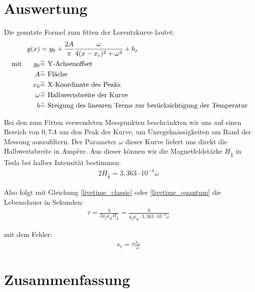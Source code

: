 \documentclass[12pt]{article}
\begin{document}
\section{Auswertung}
Die genutzte Formel zum fitten der Lorentzkurve lautet:
\begin{align}
 y(x) &= y_0+\frac{2A}{\pi}\frac{\omega}{4(x-x_c)^2+\omega^2}+b_x \\
\notag \textnormal{ mit }~~~~ y_0 &\widehat{=} \textnormal{ Y-Achsenoffset } \\
\notag A &\widehat{=} \textnormal{ Fläche } \\
\notag x_0 &\widehat{=} \textnormal{ X-Koordinate des Peaks } \\
\notag \omega &\widehat{=} \textnormal{ Halbwertsbreite der Kurve } \\
\notag b &\widehat{=} \textnormal{ Steigung des linearen Terms zur berücksichtigung der Temperatur}
\end{align}

Bei den zum Fitten verwendeten Messpunkten beschränkten wir uns auf einen Bereich von $0,7A$ um den Peak der Kurve, um Unregelmässigkeiten am Rand der Messung auszufiltern. Der Parameter $\omega$ dieser Kurve liefert uns direkt die Halbwertsbreite in Ampère. Aus dieser können wir die Magnetfeldstärke $H_{\frac{1}{2}}$ in Tesla bei halber Intensität bestimmen:
\begin{align}
 2H_{\frac{1}{2}}= 3,363\cdot 10^{-4} \omega
\end{align}

Also folgt mit Gleichung \ref{livetime_classic} oder \ref{livetime_quantum} die Lebensdauer in Sekunden:
\begin{align}
 \tau = \frac{\hbar}{2g_j \mu_B H_{\frac{1}{2}}} = \frac{\hbar}{g_j \mu_B\cdot 3,363\cdot 10^{-4} \omega}
\end{align}

mit dem Fehler:
\begin{align}
 s_{\tau}=\tau \frac{s_{\omega}}{\omega}
\end{align}







\section{Zusammenfassung}
\end{document}
